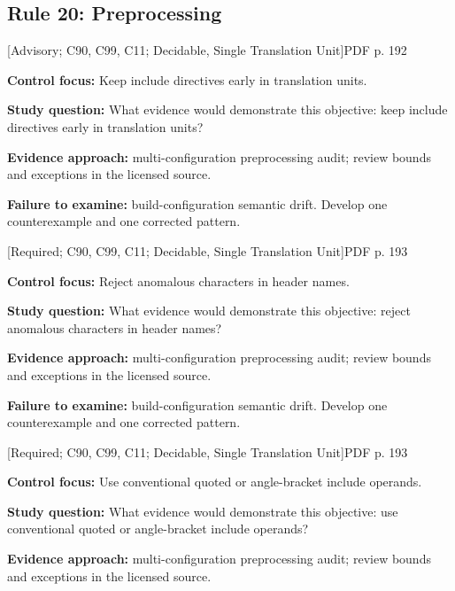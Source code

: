 \documentclass[10pt,letterpaper]{article}
\begin{document}
\subsection{Rule 20: Preprocessing}
 \textsf{\footnotesize [Advisory; C90, C99, C11; Decidable, Single Translation Unit]}\hfill{\footnotesize PDF p. 192}\par
\textbf{Control focus:} Keep include directives early in translation units.\par
\textbf{Study question:} What evidence would demonstrate this objective: keep include directives early in translation units?\par
\textbf{Evidence approach:} multi-configuration preprocessing audit; review bounds and exceptions in the licensed source.\par
\textbf{Failure to examine:} build-configuration semantic drift. Develop one counterexample and one corrected pattern.\par
\smallskip
{}
 \textsf{\footnotesize [Required; C90, C99, C11; Decidable, Single Translation Unit]}\hfill{\footnotesize PDF p. 193}\par
\textbf{Control focus:} Reject anomalous characters in header names.\par
\textbf{Study question:} What evidence would demonstrate this objective: reject anomalous characters in header names?\par
\textbf{Evidence approach:} multi-configuration preprocessing audit; review bounds and exceptions in the licensed source.\par
\textbf{Failure to examine:} build-configuration semantic drift. Develop one counterexample and one corrected pattern.\par
\smallskip
{}
 \textsf{\footnotesize [Required; C90, C99, C11; Decidable, Single Translation Unit]}\hfill{\footnotesize PDF p. 193}\par
\textbf{Control focus:} Use conventional quoted or angle-bracket include operands.\par
\textbf{Study question:} What evidence would demonstrate this objective: use conventional quoted or angle-bracket include operands?\par
\textbf{Evidence approach:} multi-configuration preprocessing audit; review bounds and exceptions in the licensed source.\par
\end{document}
